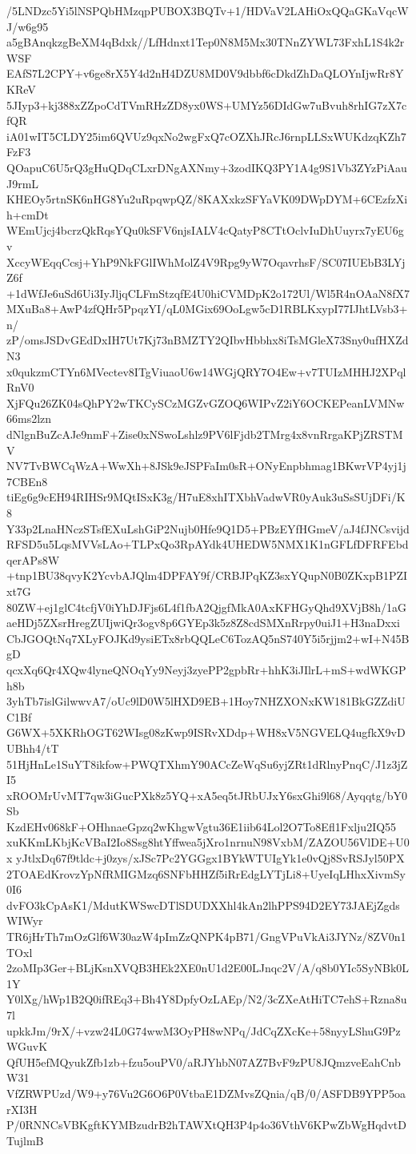 /5LNDzc5Yi5lNSPQbHMzqpPUBOX3BQTv+1/HDVaV2LAHiOxQQaGKaVqcWJ/w6g95
a5gBAnqkzgBeXM4qBdxk//LfHdnxt1Tep0N8M5Mx30TNnZYWL73FxhL1S4k2rWSF
EAfS7L2CPY+v6ge8rX5Y4d2nH4DZU8MD0V9dbbf6cDkdZhDaQLOYnIjwRr8YKReV
5JIyp3+kj388xZZpoCdTVmRHzZD8yx0WS+UMYz56DIdGw7uBvuh8rhIG7zX7cfQR
iA01wIT5CLDY25im6QVUz9qxNo2wgFxQ7cOZXhJRcJ6rnpLLSxWUKdzqKZh7FzF3
QOapuC6U5rQ3gHuQDqCLxrDNgAXNmy+3zodIKQ3PY1A4g9S1Vb3ZYzPiAauJ9rmL
KHEOy5rtnSK6nHG8Yu2uRpqwpQZ/8KAXxkzSFYaVK09DWpDYM+6CEzfzXih+cmDt
WEmUjcj4bcrzQkRqsYQu0kSFV6njsIALV4cQatyP8CTtOclvIuDhUuyrx7yEU6gv
XccyWEqqCcsj+YhP9NkFGlIWhMolZ4V9Rpg9yW7OqavrhsF/SC07IUEbB3LYjZ6f
+1dWfJe6uSd6Ui3IyJljqCLFmStzqfE4U0hiCVMDpK2o172Ul/Wl5R4nOAaN8fX7
MXuBa8+AwP4zfQHr5PpqzYI/qL0MGix69OoLgw5cD1RBLKxypI77IJhtLVsb3+n/
zP/omsJSDvGEdDxIH7Ut7Kj73nBMZTY2QIbvHbbhx8iTsMGleX73Sny0ufHXZdN3
x0qukzmCTYn6MVectev8ITgViuaoU6w14WGjQRY7O4Ew+v7TUIzMHHJ2XPqlRnV0
XjFQu26ZK04sQhPY2wTKCySCzMGZvGZOQ6WIPvZ2iY6OCKEPeanLVMNw66ms2lzn
dNlgnBuZcAJe9nmF+Zise0xNSwoLshlz9PV6lFjdb2TMrg4x8vnRrgaKPjZRSTMV
NV7TvBWCqWzA+WwXh+8JSk9eJSPFaIm0sR+ONyEnpbhmag1BKwrVP4yj1j7CBEn8
tiEg6g9cEH94RIHSr9MQtISxK3g/H7uE8xhITXbhVadwVR0yAuk3uSsSUjDFi/K8
Y33p2LnaHNczSTsfEXuLshGiP2Nujb0Hfe9Q1D5+PBzEYfHGmeV/aJ4fJNCsvijd
RFSD5u5LqsMVVsLAo+TLPxQo3RpAYdk4UHEDW5NMX1K1nGFLfDFRFEbdqerAPs8W
+tnp1BU38qvyK2YcvbAJQlm4DPFAY9f/CRBJPqKZ3sxYQupN0B0ZKxpB1PZIxt7G
80ZW+ej1glC4tcfjV0iYhDJFjs6L4f1fbA2QjgfMkA0AxKFHGyQhd9XVjB8h/1aG
aeHDj5ZXsrHregZUIjwiQr3ogv8p6GYEp3k5z8Z8cdSMXnRrpy0uiJ1+H3naDxxi
CbJGOQtNq7XLyFOJKd9ysiETx8rbQQLeC6TozAQ5nS740Y5i5rjjm2+wI+N45BgD
qcxXq6Qr4XQw4lyneQNOqYy9Neyj3zyePP2gpbRr+hhK3iJIlrL+mS+wdWKGPh8b
3yhTb7islGilwwvA7/oUc9lD0W5lHXD9EB+1Hoy7NHZXONxKW181BkGZZdiUC1Bf
G6WX+5XKRhOGT62WIsg08zKwp9ISRvXDdp+WH8xV5NGVELQ4ugfkX9vDUBhh4/tT
51HjHnLe1SuYT8ikfow+PWQTXhmY90ACcZeWqSu6yjZRt1dRlnyPnqC/J1z3jZI5
xROOMrUvMT7qw3iGucPXk8z5YQ+xA5eq5tJRbUJxY6sxGhi9l68/Ayqqtg/bY0Sb
KzdEHv068kF+OHhnaeGpzq2wKhgwVgtu36E1iib64Lol2O7To8Efl1Fxlju2IQ55
xuKKmLKbjKcVBaI2Io8Ssg8htYffwea5jXro1nrnuN98VxbM/ZAZOU56VlDE+U0x
yJtlxDq67f9tldc+j0zys/xJSc7Pc2YGGgx1BYkWTUIgYk1e0vQj8SvRSJyl50PX
2TOAEdKrovzYpNfRMIGMzq6SNFbHHZf5iRrEdgLYTjLi8+UyeIqLHhxXivmSy0I6
dvFO3kCpAsK1/MdutKWSwcDTlSDUDXXhl4kAn2lhPPS94D2EY73JAEjZgdsWIWyr
TR6jHrTh7mOzGlf6W30azW4pImZzQNPK4pB71/GngVPuVkAi3JYNz/8ZV0n1TOxl
2zoMIp3Ger+BLjKsnXVQB3HEk2XE0nU1d2E00LJnqc2V/A/q8b0YIc5SyNBk0L1Y
Y0lXg/hWp1B2Q0ifREq3+Bh4Y8DpfyOzLAEp/N2/3cZXeAtHiTC7ehS+Rzna8u7l
upkkJm/9rX/+vzw24L0G74wwM3OyPH8wNPq/JdCqZXcKe+58nyyLShuG9PzWGuvK
QfUH5efMQyukZfb1zb+fzu5ouPV0/aRJYhbN07AZ7BvF9zPU8JQmzveEahCnbW31
VfZRWPUzd/W9+y76Vu2G6O6P0VtbaE1DZMvsZQnia/qB/0/ASFDB9YPP5oarXI3H
P/0RNNCsVBKgftKYMBzudrB2hTAWXtQH3P4p4o36VthV6KPwZbWgHqdvtDTujlmB
